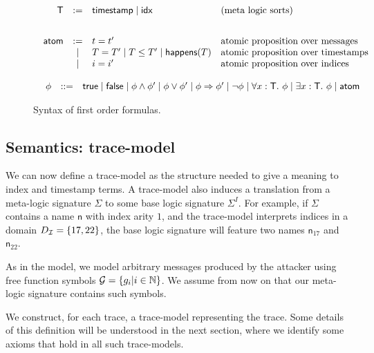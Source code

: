 \begin{figure}
  \[
  \begin{array}{c}
   \begin{array}{rcll}
    \textsf{T} &  := & \textsf{timestamp} \mid \textsf{idx} & \text{(meta logic sorts)} \\
    \\[2ex]
   \textsf{atom} & := & t=t'
 & \text{atomic proposition over messages } \\
  &\mid & T=T' \mid T \leq T' \mid \textsf{happens}(T) &  \text{atomic proposition
  over timestamps } \\
  &\mid & i=i'  &  \text{atomic proposition
    over indices } \\
    \end{array}
\\
\\
     \begin{array}{rcll}
    \phi & ::= &  \textsf{true} \mid \textsf{false} \mid \phi \wedge \phi' \mid  \phi
    \vee \phi' \mid   \phi \Rightarrow \phi'\mid \neg \phi \mid
    \forall x : \textsf{T}.\ \phi \mid \exists x:\textsf{T}.\ \phi \mid \textsf{atom} &
    \end{array}

\end{array}
    \]
    \caption{Syntax of first order formulas.}\label{fig:syntax}
\end{figure}

\subsection{Semantics: trace-model}

We can now define a trace-model as the structure needed to
give a meaning to index and timestamp terms. A trace-model
also induces a translation from a meta-logic signature $\Sigma$
to some base logic signature $\Sigma^I$. For example, if
$\Sigma$ contains a name $\mathsf{n}$ with index arity $1$, and
the trace-model interprets indices in a domain $D_{\mathcal{I}} = \{
  17, 22 \}$, the base logic signature will feature
two names $\mathsf{n}_{17}$ and $\mathsf{n}_{22}$.

As in the \BC model, we model arbitrary messages produced by the attacker
using free function symbols $\mathcal{G} = \{g_i | i \in \mathbb{N}\}$. We assume
from now on that our meta-logic signature contains such symbols.

We construct, for each trace, a trace-model representing
the trace. Some details of this definition will be understood in the next
section, where we identify some axioms that hold in all such
trace-models.

